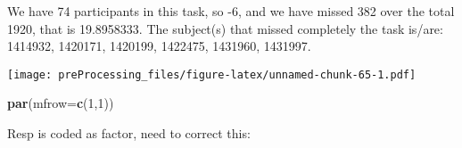 \documentclass[
]{article}
\newenvironment{Shaded}{\begin{snugshade}}{\end{snugshade}}
\newcommand{\DataTypeTok}[1]{\textcolor[rgb]{0.13,0.29,0.53}{#1}}
\newcommand{\DecValTok}[1]{\textcolor[rgb]{0.00,0.00,0.81}{#1}}
\newcommand{\KeywordTok}[1]{\textcolor[rgb]{0.13,0.29,0.53}{\textbf{#1}}}
\newcommand{\NormalTok}[1]{#1}
\newcommand{\OperatorTok}[1]{\textcolor[rgb]{0.81,0.36,0.00}{\textbf{#1}}}
\newcommand{\StringTok}[1]{\textcolor[rgb]{0.31,0.60,0.02}{#1}}
\begin{document}
We have 74 participants in this task, so -6, and we have missed 382 over
the total 1920, that is 19.8958333. The subject(s) that missed
completely the task is/are: 1414932, 1420171, 1420199, 1422475, 1431960,
1431997.

\begin{Shaded}
\end{Shaded}

\texttt{[image: preProcessing\_files/figure-latex/unnamed-chunk-65-1.pdf]}

\begin{Shaded}
\begin{Highlighting}[]
\KeywordTok{par}\NormalTok{(}\DataTypeTok{mfrow=}\KeywordTok{c}\NormalTok{(}\DecValTok{1}\NormalTok{,}\DecValTok{1}\NormalTok{))}
\end{Highlighting}
\end{Shaded}

Resp is coded as factor, need to correct this:

\begin{Shaded}
\end{Shaded}

\begin{Shaded}
\end{Shaded}
\end{document}
